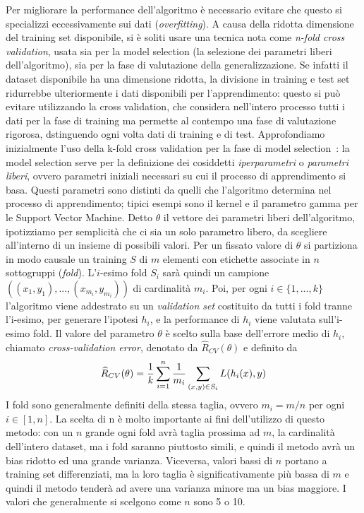 \documentclass[oneside, openany]{book}
\begin{document}
		Per migliorare la performance dell'algoritmo è necessario evitare che questo si specializzi eccessivamente sui dati (\textit{overfitting}). A causa della ridotta dimensione del training set disponibile, si è soliti usare una tecnica nota come \textit{n-fold cross validation}, usata sia per la model selection (la selezione dei parametri liberi dell'algoritmo), sia per la fase di valutazione della generalizzazione. Se infatti il dataset disponibile ha una dimensione ridotta, la divisione in training e test set ridurrebbe ulteriormente i dati disponibili per l'apprendimento: questo si può evitare utilizzando la cross validation, che considera nell'intero processo tutti i dati per la fase di training ma permette al contempo una fase di valutazione rigorosa, dstinguendo ogni volta dati di training e di test.\newline
		Approfondiamo inizialmente l'uso della k-fold cross validation per la fase di model selection~\cite{bib:cv}: la model selection serve per la definizione dei cosiddetti \textit{iperparametri} o \textit{parametri liberi}, ovvero parametri iniziali necessari su cui il processo di apprendimento si basa. Questi parametri sono distinti da quelli che l'algoritmo determina nel processo di apprendimento; tipici esempi sono il kernel e il parametro gamma per le Support Vector Machine.\newline
		Detto $\theta$ il vettore dei parametri liberi dell'algoritmo, ipotizziamo per semplicità che ci sia un solo parametro libero, da scegliere all'interno di un insieme di possibili valori. Per un fissato valore di $\theta$ si partiziona in modo causale un training $S$ di $m$ elementi con etichette associate in $n$ sottogruppi (\textit{fold}). L'$i$-esimo fold $S_i$ sarà quindi un campione $((x_{1}, y_{1}),...,(x_{m_i},y_{m_i}))$ di cardinalità $m_i$. Poi, per ogni $i\in\{1, ..., k\}$ l'algoritmo viene addestrato su un \textit{validation set} costituito da tutti i fold tranne l'i-esimo, per generare l'ipotesi $h_i$, e la performance di $h_i$ viene valutata sull'i-esimo fold. Il valore del parametro $\theta$ è scelto sulla base dell'errore medio di $h_i$, chiamato \textit{cross-validation error}, denotato da $\widehat{R}_{CV}(\theta)$ e definito da
		\[
		\widehat{R}_{CV}(\theta)={1\over k}\sum_{i=1}^n {1\over m_i}\sum_{(x,y)\in S_i} L(h_i(x),y)
		\]
		I fold sono generalmente definiti della stessa taglia, ovvero $m_i=m/n$ per ogni $i\in[1,n]$. La scelta di n è molto importante ai fini dell'utilizzo di questo metodo: con un $n$ grande ogni fold avrà taglia prossima ad $m$, la cardinalità dell'intero dataset, ma i fold saranno piuttosto simili, e quindi il metodo avrà un bias ridotto ed una grande varianza. Viceversa, valori bassi di $n$ portano a training set differenziati, ma la loro taglia è significativamente più bassa di $m$ e quindi il metodo tenderà ad avere una varianza minore ma un bias maggiore. I valori che generalmente si scelgono come $n$ sono 5 o 10.\newline
\end{document}
